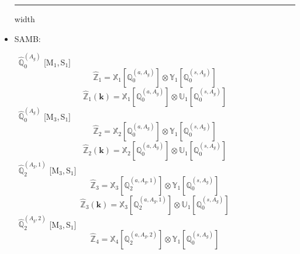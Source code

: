 \documentclass[fleqn,10pt,landscape]{article}
\begin{document}
\begin{itemize}
 \hfil \hrule height 1mm width \textwidth \hfil

\item SAMB:

\vspace{4mm}
\noindent {} $\,\,\,\hat{\mathbb{Q}}_{0}^{(A_{g})}$ [M$_{1}$,\,S$_{1}$]
\begin{dmath*}
\hat{\mathbb{Z}}_{1}=\mathbb{X}_{1}[\mathbb{Q}_{0}^{(a,A_{g})}] \otimes\mathbb{Y}_{1}[\mathbb{Q}_{0}^{(s,A_{g})}]
\end{dmath*}
\begin{dmath*}
\hat{\mathbb{Z}}_{1}(\bm{k})=\mathbb{X}_{1}[\mathbb{Q}_{0}^{(a,A_{g})}] \otimes\mathbb{U}_{1}[\mathbb{Q}_{0}^{(s,A_{g})}]
\end{dmath*}
\vspace{4mm}
\noindent {} $\,\,\,\hat{\mathbb{Q}}_{0}^{(A_{g})}$ [M$_{3}$,\,S$_{1}$]
\begin{dmath*}
\hat{\mathbb{Z}}_{2}=\mathbb{X}_{2}[\mathbb{Q}_{0}^{(a,A_{g})}] \otimes\mathbb{Y}_{1}[\mathbb{Q}_{0}^{(s,A_{g})}]
\end{dmath*}
\begin{dmath*}
\hat{\mathbb{Z}}_{2}(\bm{k})=\mathbb{X}_{2}[\mathbb{Q}_{0}^{(a,A_{g})}] \otimes\mathbb{U}_{1}[\mathbb{Q}_{0}^{(s,A_{g})}]
\end{dmath*}
\vspace{4mm}
\noindent {} $\,\,\,\hat{\mathbb{Q}}_{2}^{(A_{g},1)}$ [M$_{3}$,\,S$_{1}$]
\begin{dmath*}
\hat{\mathbb{Z}}_{3}=\mathbb{X}_{3}[\mathbb{Q}_{2}^{(a,A_{g},1)}] \otimes\mathbb{Y}_{1}[\mathbb{Q}_{0}^{(s,A_{g})}]
\end{dmath*}
\begin{dmath*}
\hat{\mathbb{Z}}_{3}(\bm{k})=\mathbb{X}_{3}[\mathbb{Q}_{2}^{(a,A_{g},1)}] \otimes\mathbb{U}_{1}[\mathbb{Q}_{0}^{(s,A_{g})}]
\end{dmath*}
\vspace{4mm}
\noindent {} $\,\,\,\hat{\mathbb{Q}}_{2}^{(A_{g},2)}$ [M$_{3}$,\,S$_{1}$]
\begin{dmath*}
\hat{\mathbb{Z}}_{4}=\mathbb{X}_{4}[\mathbb{Q}_{2}^{(a,A_{g},2)}] \otimes\mathbb{Y}_{1}[\mathbb{Q}_{0}^{(s,A_{g})}]
\end{dmath*}
\begin{dmath*}

\end{dmath*}
\end{itemize}
\end{document}
